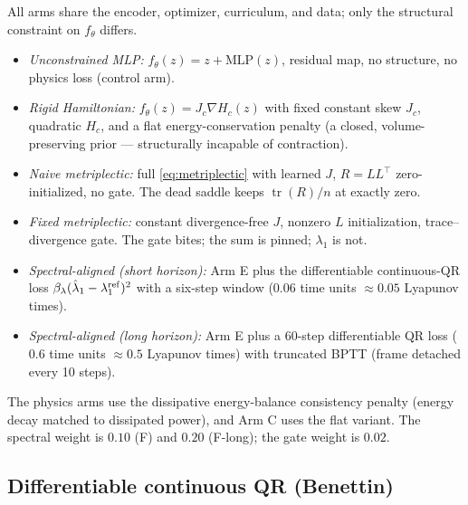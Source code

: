 \documentclass[11pt]{article}
\newcommand{\tr}{\operatorname{tr}}
\newcommand{\grad}{\nabla}
\begin{document}
All arms share the encoder, optimizer, curriculum, and data; only the
structural constraint on $f_\theta$ differs.
\begin{itemize}
\item[\textbf{B}] \emph{Unconstrained MLP:} $f_\theta(z)=z+\mathrm{MLP}(z)$,
residual map, no structure, no physics loss (control arm).
\item[\textbf{C}] \emph{Rigid Hamiltonian:} $f_\theta(z)=J_c\grad H_c(z)$
with fixed constant skew $J_c$, quadratic $H_c$, and a flat
energy-conservation penalty (a closed, volume-preserving prior ---
structurally incapable of contraction).
\item[\textbf{D}] \emph{Naive metriplectic:} full
\eqref{eq:metriplectic} with learned $J$, $R=LL^\top$ zero-initialized,
no gate. The dead saddle keeps $\tr(R)/n$ at exactly zero.
\item[\textbf{E}] \emph{Fixed metriplectic:} constant divergence-free
$J$, nonzero $L$ initialization, trace--divergence gate. The gate bites;
the sum is pinned; $\lambda_1$ is not.
\item[\textbf{F}] \emph{Spectral-aligned (short horizon):} Arm E plus
the differentiable continuous-QR loss
$\beta_\lambda(\hat\lambda_1-\lambda_1^{\rm ref})^2$ with a six-step
window ($0.06$ time units $\approx0.05$ Lyapunov times).
\item[\textbf{F-long}] \emph{Spectral-aligned (long horizon):} Arm E
plus a 60-step differentiable QR loss ($0.6$ time units $\approx0.5$
Lyapunov times) with truncated BPTT (frame detached every 10 steps).
\end{itemize}
The physics arms use the dissipative energy-balance consistency penalty
(energy decay matched to dissipated power), and Arm C uses the flat
variant. The spectral weight is $0.10$ (F) and $0.20$ (F-long); the gate
weight is $0.02$.

\subsection{Differentiable continuous QR (Benettin)}
\label{sec:methods-qr}
\end{document}
